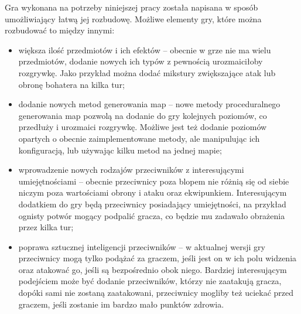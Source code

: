 \documentclass[12pt,twoside]{article}
\begin{document}
Gra wykonana na potrzeby niniejszej pracy została napisana w sposób umożliwiający łatwą jej rozbudowę. Możliwe elementy gry, które można rozbudować to między innymi:
\begin{itemize}
	\item większa ilość przedmiotów i ich efektów -- obecnie w grze nie ma wielu przedmiotów, dodanie nowych ich typów z pewnością urozmaiciłoby rozgrywkę. Jako przykład można dodać mikstury zwiększające atak lub obronę bohatera na kilka tur;
	\item dodanie nowych metod generowania map -- nowe metody proceduralnego generowania map pozwolą na dodanie do gry kolejnych poziomów, co przedłuży i urozmaici rozgrywkę. Możliwe jest też dodanie poziomów opartych o obecnie zaimplementowane metody, ale manipulując ich konfiguracją, lub używając kilku metod na jednej mapie;
	\item wprowadzenie nowych rodzajów przeciwników z interesującymi umiejętnościami -- obecnie przeciwnicy poza blopem nie różnią się od siebie niczym poza wartościami obrony i ataku oraz ekwipunkiem. Interesującym dodatkiem do gry będą przeciwnicy posiadający umiejętności, na przykład ognisty potwór mogący podpalić gracza, co będzie mu zadawało obrażenia przez kilka tur;
	\item poprawa sztucznej inteligencji przeciwników -- w aktualnej wersji gry przeciwnicy mogą tylko podążać za graczem, jeśli jest on w ich polu widzenia oraz atakować go, jeśli są bezpośrednio obok niego. Bardziej interesującym podejściem może być dodanie przeciwników, którzy nie zaatakują gracza, dopóki sami nie zostaną zaatakowani, przeciwnicy mogliby też uciekać przed graczem, jeśli zostanie im bardzo mało punktów zdrowia.
\end{itemize}


\clearpage



\end{document}
